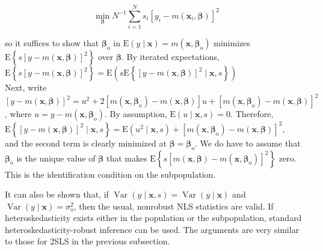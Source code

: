 \documentclass[10pt]{article}
\begin{document}
\begin{equation*}
\min _{\boldsymbol{\beta}} N^{-1} \sum_{i=1}^{N} s_{i}\left[y_{i}-m\left(\mathbf{x}_{i}, \boldsymbol{\beta}\right)\right]^{2} \tag{19.43}
\end{equation*}


so it suffices to show that $\boldsymbol{\beta}_{\mathrm{o}}$ in $\mathrm{E}(y \mid \mathbf{x})=m\left(\mathbf{x}, \boldsymbol{\beta}_{\mathrm{o}}\right)$ minimizes $\mathrm{E}\left\{s[y-m(\mathbf{x}, \boldsymbol{\beta})]^{2}\right\}$ over $\boldsymbol{\beta}$. By iterated expectations,\\
$\mathrm{E}\left\{s[y-m(\mathbf{x}, \boldsymbol{\beta})]^{2}\right\}=\mathrm{E}\left(s \mathrm{E}\left\{[y-m(\mathbf{x}, \boldsymbol{\beta})]^{2} \mid \mathbf{x}, s\right\}\right)$\\
Next, write $[y-m(\mathbf{x}, \boldsymbol{\beta})]^{2}=u^{2}+2\left[m\left(\mathbf{x}, \boldsymbol{\beta}_{\mathrm{o}}\right)-m(\mathbf{x}, \boldsymbol{\beta})\right] u+\left[m\left(\mathbf{x}, \boldsymbol{\beta}_{\mathrm{o}}\right)-m(\mathbf{x}, \boldsymbol{\beta})\right]^{2}$, where $u=y-m\left(\mathbf{x}, \boldsymbol{\beta}_{\mathrm{o}}\right)$. By assumption, $\mathrm{E}(u \mid \mathbf{x}, s)=0$. Therefore,\\
$\mathrm{E}\left\{[y-m(\mathbf{x}, \boldsymbol{\beta})]^{2} \mid \mathbf{x}, s\right\}=\mathrm{E}\left(u^{2} \mid \mathbf{x}, s\right)+\left[m\left(\mathbf{x}, \boldsymbol{\beta}_{\mathrm{o}}\right)-m(\mathbf{x}, \boldsymbol{\beta})\right]^{2}$,\\
and the second term is clearly minimized at $\boldsymbol{\beta}=\boldsymbol{\beta}_{\mathrm{o}}$. We do have to assume that $\boldsymbol{\beta}_{\mathrm{o}}$ is the unique value of $\boldsymbol{\beta}$ that makes $\mathrm{E}\left\{s\left[m(\mathbf{x}, \boldsymbol{\beta})-m\left(\mathbf{x}, \boldsymbol{\beta}_{\mathrm{o}}\right)\right]^{2}\right\}$ zero. This is the identification condition on the subpopulation.

It can also be shown that, if $\operatorname{Var}(y \mid \mathbf{x}, s)=\operatorname{Var}(y \mid \mathbf{x})$ and $\operatorname{Var}(y \mid \mathbf{x})=\sigma_{\mathrm{o}}^{2}$, then the usual, nonrobust NLS statistics are valid. If heteroskedasticity exists either in the population or the subpopulation, standard heteroskedasticity-robust inference can be used. The arguments are very similar to those for 2SLS in the previous subsection.
\end{document}
